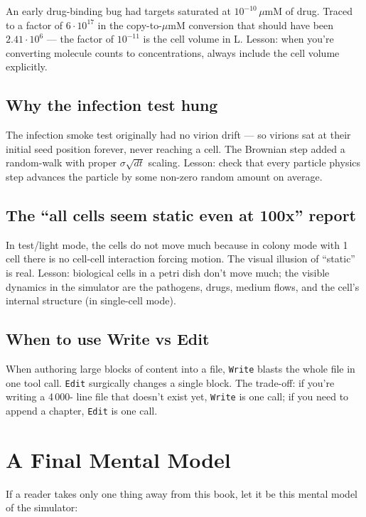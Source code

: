 \documentclass[11pt,letterpaper,twoside,openany]{book}
\newcommand{\code}[1]{\texttt{#1}}
\newcommand{\um}{\ensuremath{\mu\text{m}}}
\begin{document}
An early drug-binding bug had targets saturated at
$10^{-10}\,\um\text{M}$ of drug. Traced to a factor of
$6 \cdot 10^{17}$ in the copy-to-\um M conversion that should have
been $2.41\cdot 10^6$ --- the factor of $10^{-11}$ is the cell
volume in L. Lesson: when you're converting molecule counts to
concentrations, always include the cell volume explicitly.

\section{Why the infection test hung}

The infection smoke test originally had no virion drift --- so
virions sat at their initial seed position forever, never reaching
a cell. The Brownian step added a random-walk with proper
$\sigma\sqrt{dt}$ scaling. Lesson: check that every particle
physics step advances the particle by some non-zero random amount
on average.

\section{The ``all cells seem static even at 100x'' report}

In test/light mode, the cells do not move much because in colony
mode with 1 cell there is no cell-cell interaction forcing motion.
The visual illusion of ``static'' is real. Lesson: biological cells
in a petri dish don't move much; the visible dynamics in the
simulator are the pathogens, drugs, medium flows, and the cell's
internal structure (in single-cell mode).

\section{When to use Write vs Edit}

When authoring large blocks of content into a file, \code{Write}
blasts the whole file in one tool call. \code{Edit} surgically
changes a single block. The trade-off: if you're writing a 4\,000-
line file that doesn't exist yet, \code{Write} is one call; if you
need to append a chapter, \code{Edit} is one call.

\chapter{A Final Mental Model}
\label{ch:mental-model}

If a reader takes only one thing away from this book, let it be
this mental model of the simulator:
\end{document}
